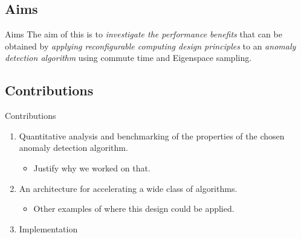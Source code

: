 \subsection{Aims}
\begin{frame}[label=aims]{Aims}
    The aim of this \thesis{} is to \emph{investigate the performance benefits}
    that can be obtained by \emph{applying reconfigurable computing design
    principles} to an \emph{anomaly detection algorithm} using commute time and
    Eigenspace sampling.
\end{frame}

\subsection{Contributions}
\begin{frame}[label=contributions]{Contributions}
    \begin{enumerate}
        \item Quantitative analysis and benchmarking of the properties of the
            chosen anomaly detection algorithm.
        \begin{itemize}
            \item Justify why we worked on that.
        \end{itemize}
        \item An architecture for accelerating a wide class of algorithms.
        \begin{itemize}
            \item Other examples of where this design could be applied.
        \end{itemize}
        \item Implementation
    \end{enumerate}
\end{frame}